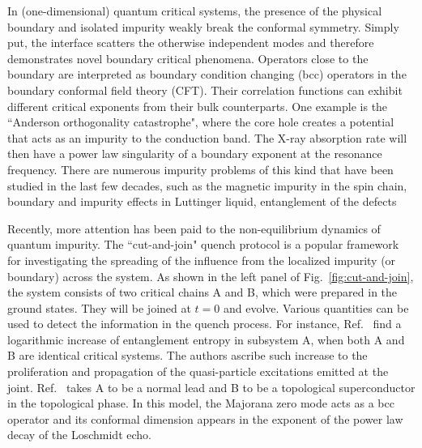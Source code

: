 

In (one-dimensional) quantum critical systems, the presence of the physical boundary and isolated impurity weakly break the conformal symmetry. Simply put, the interface scatters the otherwise independent modes and therefore demonstrates novel boundary critical phenomena\cite{cardy_boundary_2004}. Operators close to the boundary are interpreted as boundary condition changing (bcc) operators\cite{oshikawa_boundary_1997,affleck_boundary_1997} in the boundary conformal field theory (CFT). Their correlation functions can exhibit different critical exponents from their bulk counterparts\cite{cardy_conformal_1984}. One example is the ``Anderson orthogonality catastrophe", where the core hole creates a potential that acts as an impurity to the conduction band. The X-ray absorption rate will then have a power law singularity of a boundary exponent\cite{affleck_boundary_1997} at the resonance frequency. There are numerous impurity problems of this kind that have been studied in the last few decades, such as the magnetic impurity in the spin chain\cite{eggert_magnetic_1992}, boundary and impurity effects in Luttinger liquid\cite{fabrizio_interacting_1995}, entanglement of the defects\cite{peschel_entanglement_2005, igloi_entanglement_2009,calabrese_entanglement_2012} \etc

Recently, more attention has been paid to the non-equilibrium dynamics of quantum impurity\cite{hegde_quench_2015,francica_local_2016,lupo_transient_2016,lee_spatiotemporal_2016,chung_memory_2016,sacramento_edge_2016,vasseur_expansion_2015,mazza_overlap_2016}. The ``cut-and-join" quench protocol is a popular framework for investigating the spreading of the influence from the localized impurity (or boundary) across the system. As shown in the left panel of Fig.~\ref{fig:cut-and-join}, the system consists of two critical chains A and B, which were prepared in the ground states. They will be joined at $t = 0$ and evolve. Various quantities can be used to detect the information in the quench process. For instance, Ref.~ find a logarithmic increase of entanglement entropy in subsystem A, when both A and B are identical critical systems. The authors ascribe such increase to the proliferation and propagation of the quasi-particle excitations emitted at the joint. Ref.~ takes A to be a normal lead and B to be a topological superconductor in the topological phase. In this model, the Majorana zero mode acts as a bcc operator and its conformal dimension appears in the exponent of the power law decay of the Loschmidt echo.

